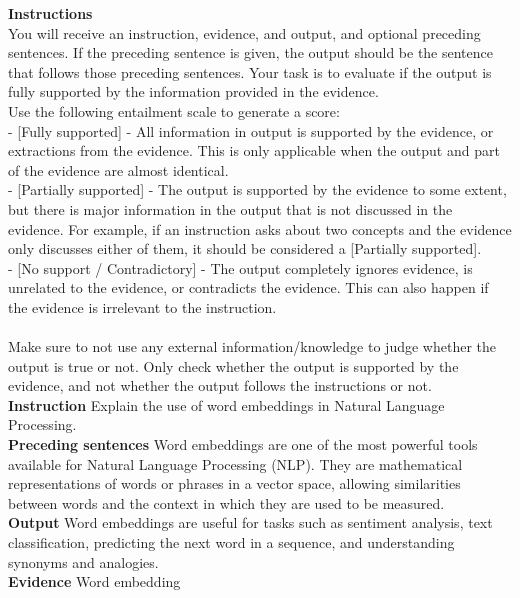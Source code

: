 \begin{table}[h!]
\begin{tcolorbox}
{\bf Instructions}\\ 
You will receive an instruction, evidence, and output, and optional preceding sentences.  If the preceding sentence is given, the output should be the sentence that follows those preceding sentences. Your task is to evaluate if the output is fully supported by the information provided in the evidence.\\
Use the following entailment scale to generate a score:\\
- [Fully supported] - All information in output is supported by the evidence, or extractions from the evidence. This is only applicable when the output and part of the evidence are almost identical. \\
- [Partially supported] - The output is supported by the evidence to some extent, but there is major information in the output that is not discussed in the evidence. For example, if an instruction asks about two concepts and the evidence only discusses either of them, it should be considered a [Partially supported]. \\
- [No support / Contradictory] - The output completely ignores evidence, is unrelated to the evidence, or contradicts the evidence. This can also happen if the evidence is irrelevant to the instruction.\\\\
Make sure to not use any external information/knowledge to judge whether the output is true or not. Only check whether the output is supported by the evidence, and not whether the output follows the instructions or not.
\tcblower
{\bf Instruction} Explain the use of word embeddings in Natural Language Processing. \\
{\bf Preceding sentences} Word embeddings are one of the most powerful tools available for Natural Language Processing (NLP). They are mathematical representations of words or phrases in a vector space, allowing similarities between words and the context in which they are used to be measured. \\
{\bf Output} Word embeddings are useful for tasks such as sentiment analysis, text classification, predicting the next word in a sequence, and understanding synonyms and analogies. \\
{\bf Evidence} 
Word embedding \\

\end{tcolorbox}
\end{table}
